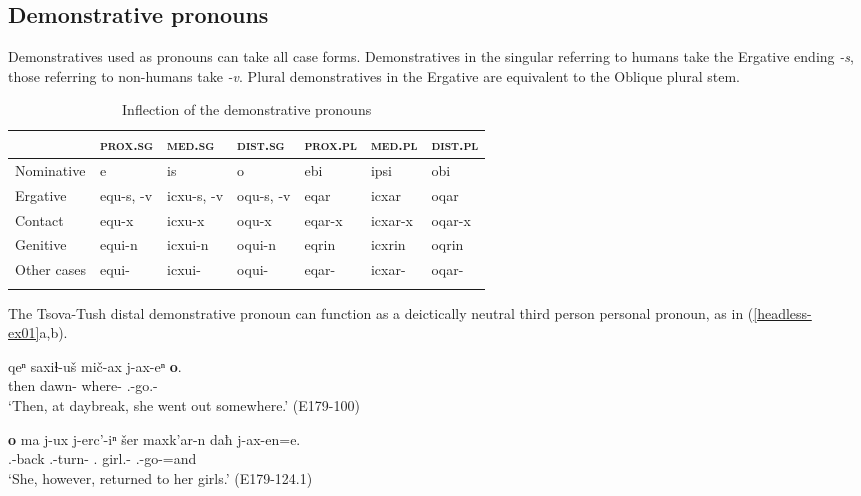\subsection{Demonstrative pronouns} \label{dempro}

Demonstratives used as pronouns can take all case forms. Demonstratives in the singular referring to humans take the Ergative ending \textit{-s}, those referring to non-humans take \textit{-v}. Plural demonstratives in the Ergative are equivalent to the Oblique plural stem.


\begin{table}
	\begin{tabular}{lllllll}
		\lsptoprule
		& {\textsc{prox.sg}} & {\textsc{med.sg}} & {\textsc{dist.sg}} & {\textsc{prox.pl}} & {\textsc{med.pl}} & {\textsc{dist.pl}}  \\
		\midrule
		{Nominative} & e & is & o & ebi & ipsi & obi \\
		{Ergative} & equ-s, -v & icxu-s, -v & oqu-s, -v & eqar & icxar & oqar \\
		{Contact} & equ-x & icxu-x & oqu-x & eqar-x & icxar-x & oqar-x \\
		{Genitive} & equi-n & icxui-n & oqui-n & eqrin & icxrin & oqrin \\
		{Other cases} & equi- & icxui- & oqui- & eqar- & icxar- & oqar- \\
		\lspbottomrule
	\end{tabular}
	\caption{Inflection of the demonstrative pronouns}
	\label{tabledempro}
\end{table}

The Tsova-Tush distal demonstrative pronoun can function as a deictically neutral third person personal pronoun, as in (\ref{headless-ex01}a,b).

\begin{exe}
	\ex\label{headless-ex01}
	\begin{xlist}
		
		
			\ex\label{headless-ex01a}
			\gll qeⁿ saxiɬ-uš mič-ax j-ax-eⁿ \textbf{o}. \\
			then dawn-{\Simul} where-{\Indf} {\F}.{\Sg}-go.{\Pfv}-{\Aor} \textbf{{\Dist}} \\
			\trans `Then, at daybreak, she went out somewhere.'
			\hfill (E179-100)
		
		
		
			\ex\label{headless-ex01b}
			\gll  \textbf{o} ma j-ux j-erc'-iⁿ šer maxk'ar-n daħ j-ax-en=e. \\
			\textbf{{\Dist}} {\Contr} {\F}.{\Sg}-back {\F}.{\Sg}-turn-{\Aor} {\Refl}.{\Poss} girl.{\Pl}-{\Dat} {\Pv} {\F}.{\Sg}-go-{\Aor}=and \\
			\trans `She, however, returned to her girls.'
			\hfill (E179-124.1)
		
	\end{xlist}
\end{exe}

